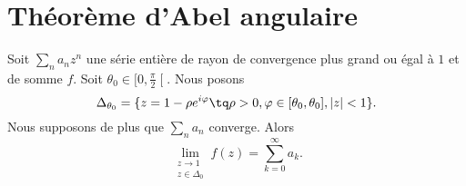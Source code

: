 \section{Théorème d'Abel angulaire}

\begin{theorem}   \label{ThoTGjmeen}
	Soit \( \sum_{n}a_nz^n\) une série entière de rayon de convergence plus grand ou égal à \( 1\) et de somme \( f\). Soit \( \theta_0\in\mathopen[ 0 , \frac{ \pi }{2} \mathclose[\). Nous posons
	\begin{equation}
		\Delta_{\theta_0}=\{ z=1-\rho e^{i\varphi}\tq \rho>0,\varphi\in\mathopen[ \theta_0 , \theta_0 \mathclose],| z |<1 \}.
	\end{equation}
	Nous supposons de plus que \( \sum_na_n\) converge. Alors
	\begin{equation}
		\lim_{\substack{z\to1\\z\in\Delta_0}}f(z)=\sum_{k=0}^{\infty}a_k.
	\end{equation}
\end{theorem}

